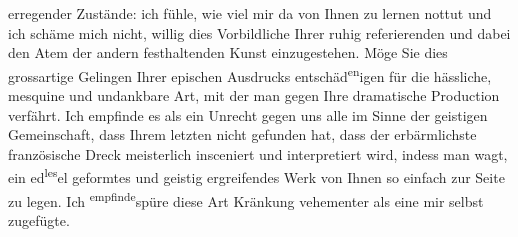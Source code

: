                erregender Zustände: ich fühle, wie viel mir da von Ihnen zu lernen nottut und ich
               schäme mich nicht, willig dies Vorbildliche Ihrer ruhig referierenden und dabei den
               Atem der andern festhaltenden Kunst einzugestehen. Möge Sie {\pb}dies grossartige Gelingen Ihrer epischen
               Ausdrucks entschäd\substVorne{}\textsuperscript{en}\substDazwischen{}igen\substHinten{} für die hässliche, mesquine und undankbare Art, mit der man gegen Ihre
               dramatische Production verfährt. Ich empfinde es als ein Unrecht gegen uns alle im
               Sinne der geistigen Gemeinschaft, dass Ihrem letzten \label{K_L03674-3v}\label{K_L03674-3h} nicht gefunden hat, dass der
               erbärmlichste französische Dreck meisterlich insceniert und interpretiert wird,
               indess man wagt, ein ed\substVorne{}\textsuperscript{les}\substDazwischen{}el\substHinten{} geformtes und geistig ergreifendes Werk von Ihnen so einfach zur Seite zu
               legen. Ich \substVorne{}\textsuperscript{empfinde}{\allowbreak}\substDazwischen{}spüre\substHinten{} diese Art Kränkung vehementer als eine mir selbst zugefügte.\pend
           
